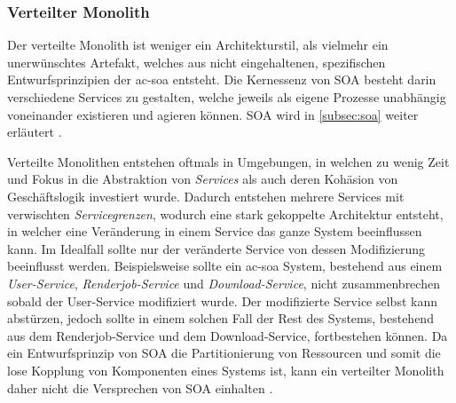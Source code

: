     \subsubsection{Verteilter Monolith}
    \label{subsubsec:distributedmonolith}
    Der verteilte Monolith ist weniger ein Architekturstil, als vielmehr ein unerwünschtes Artefakt, welches aus nicht eingehaltenen, spezifischen Entwurfsprinzipien der \gls{ac-soa} entsteht. Die Kernessenz von SOA besteht darin verschiedene Services zu gestalten, welche jeweils als eigene Prozesse unabhängig voneinander existieren und agieren können. SOA wird in \autoref{subsec:soa} weiter erläutert \parencites{newman2019monolith}{erl2005soa}.
    
    Verteilte Monolithen entstehen oftmals in Umgebungen, in welchen zu wenig Zeit und Fokus in die Abstraktion von \emph{Services} als auch deren Kohäsion von Geschäftslogik investiert wurde. Dadurch entstehen mehrere Services mit verwischten \emph{Servicegrenzen}, wodurch eine stark gekoppelte Architektur entsteht, in welcher eine Veränderung in einem Service das ganze System beeinflussen kann. Im Idealfall sollte nur der veränderte Service von dessen Modifizierung beeinflusst werden. Beispielsweise sollte ein \gls{ac-soa} System, bestehend aus einem \emph{User-Service}, \emph{Renderjob-Service} und \emph{Download-Service}, nicht zusammenbrechen sobald der User-Service modifiziert wurde. Der modifizierte Service selbst kann abstürzen, jedoch sollte in einem solchen Fall der Rest des Systems, bestehend aus dem Renderjob-Service und dem Download-Service, fortbestehen können. Da ein Entwurfsprinzip von SOA die Partitionierung von Ressourcen und somit die lose Kopplung von Komponenten eines Systems ist, kann ein verteilter Monolith daher nicht die Versprechen von SOA einhalten \parencites{newman2019monolith}{richardson2018mspatterns}.
    \clearpage


